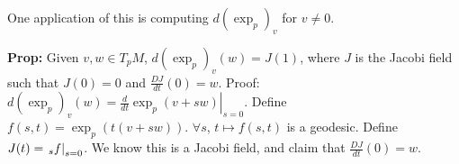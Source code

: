 \documentclass[10pt,letterpaper]{article}
\newcommand{\n}{\hfill\break}
\newcommand{\nn}{\vspace{0.5\baselineskip}\n}
\newcommand{\hangblock}[2]{\par\noindent\settowidth{\hangindent}{\textbf{#1: }}\textbf{#1: }\nolinebreak#2}
\newcommand{\prop}[1]{\hangblock{Prop}{#1}}
\let\d\relax
\newcommand{\d}{\partial}
\newcommand{\restr}[1]{\left.#1\right|}
\begin{document}
\par\noindent
One application of this is computing $d(\exp_{p})_{v}$ for $v\ne{}0$.\n

\prop{
	Given $v,w\in{}T_{p}M$, $d(\exp_{p})_{v}(w)=J(1)$, where $J$ is the Jacobi field such that $J(0)=0$ and $\frac{DJ}{dt}(0)=w$.\nn
	Proof: $d(\exp_{p})_{v}(w)=\restr{\frac{d}{dt}\exp_{p}(v+sw)}_{s=0}$. Define $f(s,t)=\exp_{p}(t(v+sw))$. $\forall{}s$, $t\mapsto{}f(s,t)$ is a geodesic. Define $J(t)=\restr{\d_{s}f}_{s=0}$. We know this is a Jacobi field, and claim that $\frac{DJ}{dt}(0)=w$.\n
}
\end{document}

